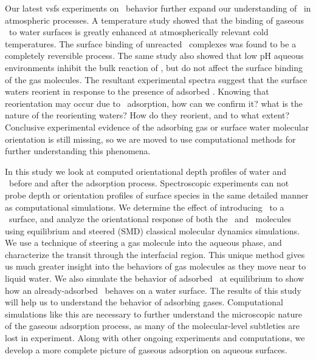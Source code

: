 Our latest vsfs experiments on \suldiox~behavior further expand our understanding of \suldiox~in atmospheric processes.\cite{Ota2011} A temperature study showed that the binding of gaseous \suldiox~to water surfaces is greatly enhanced at atmospherically relevant cold temperatures. The surface binding of unreacted \suldiox~complexes was found to be a completely reversible process. The same study also showed that low pH aqueous environments inhibit the bulk reaction of \suldiox, but do not affect the surface binding of the gas molecules. The resultant experimental spectra suggest that the surface waters reorient in response to the presence of adsorbed \suldiox. Knowing that reorientation may occur due to \suldiox~adsorption, how can we confirm it? what is the nature of the reorienting waters? How do they reorient, and to what extent? Conclusive experimental evidence of the adsorbing gas or surface water molecular orientation is still missing, so we are moved to use computational methods for further understanding this phenomena.

In this study we look at computed orientational depth profiles of water and \suldiox~before and after the adsorption process. Spectroscopic experiments can not probe depth or orientation profiles of surface species in the same detailed manner as computational simulations. We determine the effect of introducing \suldiox~to a \wat~surface, and analyze the orientational response of both the \suldiox~and \wat~molecules using equilibrium and steered (SMD) classical molecular dynamics simulations. We use a technique of steering a gas molecule into the aqueous phase, and characterize the transit through the interfacial region. This unique method gives us much greater insight into the behaviors of gas molecules as they move near to liquid water. We also simulate the behavior of adsorbed \suldiox~at equilibrium to show how an already-adsorbed \suldiox~behaves on a water surface. The results of this study will help us to understand the behavior of adsorbing gases. Computational simulations like this are necessary to further understand the microscopic nature of the gaseous adsorption process, as many of the molecular-level subtleties are lost in experiment. Along with other ongoing experiments and computations, we develop a more complete picture of gaseous adsorption on aqueous surfaces.
